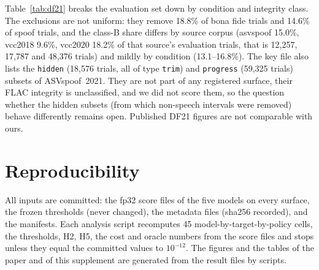 \documentclass[10pt]{article}
\newcommand{\wide}[1]{\begingroup\footnotesize\setlength{\tabcolsep}{3.5pt}\resizebox{\textwidth}{!}{}\endgroup}
\begin{document}
Table~\ref{tab:df21} breaks the evaluation set down by condition and integrity class. The exclusions are not uniform: they remove 18.8\% of bona
fide trials and 14.6\% of spoof trials, and the class-B share differs by source corpus (asvspoof 15.0\%, vcc2018 9.6\%, vcc2020 18.2\%
of that source's evaluation trials, that is 12,257, 17,787 and 48,376 trials) and mildly by condition (13.1--16.8\%). The key file also lists the
\texttt{hidden} (18,576 trials, all of type \texttt{trim}) and \texttt{progress} (59,325 trials) subsets of ASVspoof~2021. They are not part of any
registered surface, their FLAC integrity is unclassified, and we did not score them, so the question whether the hidden subsets (from which
non-speech intervals were removed) behave differently remains open. Published DF21 figures are not comparable with ours.

\begin{table}[!ht]
\caption{DF21 evaluation trials by media condition and FLAC integrity class: class A (libFLAC 1.4 rejects the file, 1.3 decodes it and the MD5
verifies), class B (MD5 fails), the verified subset (evaluation minus B) and the clean subset (evaluation minus A and B).}
\label{tab:df21}
\centering
\wide{s_tab_df21}
\end{table}

\section{Reproducibility}
All inputs are committed: the fp32 score files of the five models on every surface, the frozen thresholds (never changed), the metadata files
(sha256 recorded), and the manifests. Each analysis script recomputes 45 model-by-target-by-policy cells, the thresholds, H2, H5, the cost and
oracle numbers from the score files and stops unless they equal the committed values to \(10^{-12}\). The figures and the tables of the
paper and of this supplement are generated from the result files by scripts.



\end{document}
